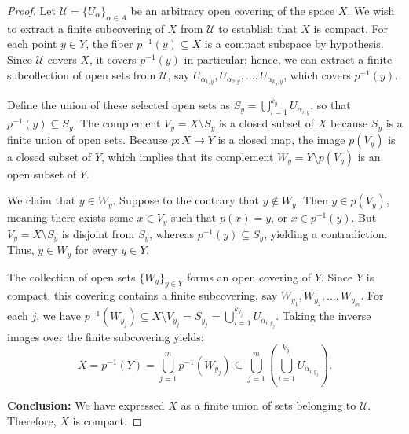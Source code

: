 
\begin{proof}
Let $\mathcal U=\{U_\alpha\}_{\alpha\in A}$ be an arbitrary open covering of the space $X$. We
wish to extract a finite subcovering of $X$ from $\mathcal U$ to establish that $X$ is compact.
For each point $y\in Y$, the fiber $p^{-1}(y)\subseteq X$ is a compact subspace by hypothesis.
Since $\mathcal U$ covers $X$, it covers $p^{-1}(y)$ in particular; hence, we can extract a
finite subcollection of open sets from $\mathcal U$, say
$U_{\alpha_{1,y}},U_{\alpha_{2,y}},\dots,U_{\alpha_{k_y,y}}$, which covers $p^{-1}(y)$.

Define the union of these selected open sets as $S_y=\bigcup_{i=1}^{k_y}U_{\alpha_{i,y}}$, so
that $p^{-1}(y)\subseteq S_y$. The complement $V_y=X\setminus S_y$ is a closed subset of $X$
because $S_y$ is a finite union of open sets. Because $p\colon X\to Y$ is a closed map, the
image $p(V_y)$ is a closed subset of $Y$, which implies that its complement
$W_y=Y\setminus p(V_y)$ is an open subset of $Y$.

We claim that $y\in W_y$. Suppose to the contrary that $y\notin W_y$. Then $y\in p(V_y)$,
meaning there exists some $x\in V_y$ such that $p(x)=y$, or $x\in p^{-1}(y)$. But
$V_y=X\setminus S_y$ is disjoint from $S_y$, whereas $p^{-1}(y)\subseteq S_y$, yielding a
contradiction. Thus, $y\in W_y$ for every $y\in Y$.

The collection of open sets $\{W_y\}_{y\in Y}$ forms an open covering of $Y$. Since $Y$ is
compact, this covering contains a finite subcovering, say $W_{y_1},W_{y_2},\dots,W_{y_m}$. For
each $j$, we have
$p^{-1}(W_{y_j})\subseteq X\setminus V_{y_j}=S_{y_j}=\bigcup_{i=1}^{k_{y_j}}U_{\alpha_{i,y_j}}$.
Taking the inverse images over the finite subcovering yields:
\[ X=p^{-1}(Y)=\bigcup_{j=1}^m p^{-1}(W_{y_j})
   \subseteq\bigcup_{j=1}^m\left(\bigcup_{i=1}^{k_{y_j}}U_{\alpha_{i,y_j}}\right). \]

\textbf{Conclusion:} We have expressed $X$ as a finite union of sets belonging to $\mathcal U$.
Therefore, $X$ is compact.
\end{proof}
